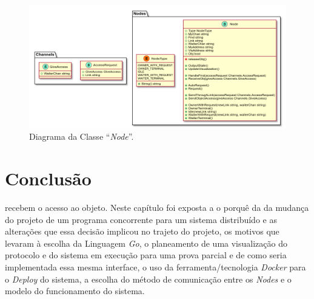\begin{figure}[ht]
\centering
\includegraphics[width=400pt]{node_class_diagram.png}
\caption{Diagrama da Classe ``\emph{Node}''.}
\label{engenharia:img:classe}
\end{figure}




\section{Conclusão}
\label{engenharia:sec:conclusão} recebem o acesso ao objeto.
Neste capítulo foi exposta a o porquê da da mudança do projeto de um programa concorrente para um sistema distribuído e as alterações que essa decisão implicou no trajeto do projeto,
os motivos que levaram à escolha da Linguagem \emph{Go}, o planeamento de uma visualização do protocolo e do sistema em execução para uma prova parcial
e de como seria implementada essa
mesma interface, o uso da ferramenta/tecnologia \emph{Docker} para o \emph{Deploy} do sistema, a escolha do método de comunicação entre os \emph{Nodes} e o modelo
do funcionamento do sistema.

